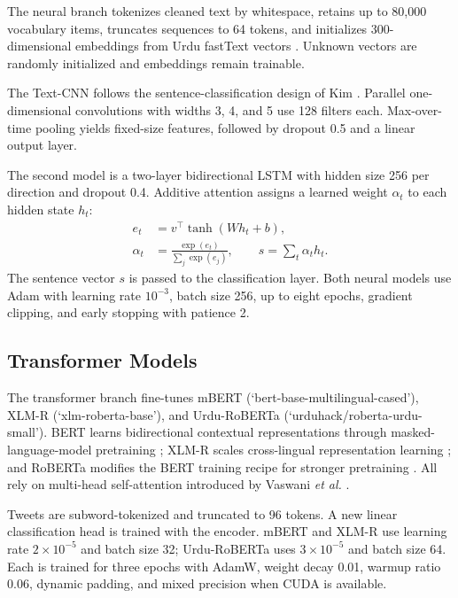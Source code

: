 \documentclass[conference]{IEEEtran}
\begin{document}
The neural branch tokenizes cleaned text by whitespace, retains up to 80,000 vocabulary items, truncates sequences to 64 tokens, and initializes 300-dimensional embeddings from Urdu fastText vectors \cite{mikolov2018fasttext}. Unknown vectors are randomly initialized and embeddings remain trainable.

The Text-CNN follows the sentence-classification design of Kim \cite{kim2014cnn}. Parallel one-dimensional convolutions with widths 3, 4, and 5 use 128 filters each. Max-over-time pooling yields fixed-size features, followed by dropout 0.5 and a linear output layer.

The second model is a two-layer bidirectional LSTM \cite{hochreiter1997lstm} with hidden size 256 per direction and dropout 0.4. Additive attention \cite{bahdanau2015attention} assigns a learned weight $\alpha_t$ to each hidden state $h_t$:
\begin{align}
e_t&=v^\top\tanh(Wh_t+b),\\
\alpha_t&=\frac{\exp(e_t)}{\sum_j\exp(e_j)},\qquad
s=\sum_t\alpha_t h_t.
\end{align}
The sentence vector $s$ is passed to the classification layer. Both neural models use Adam with learning rate $10^{-3}$, batch size 256, up to eight epochs, gradient clipping, and early stopping with patience 2.

\subsection{Transformer Models}

The transformer branch fine-tunes mBERT (`bert-base-multilingual-cased'), XLM-R (`xlm-roberta-base'), and Urdu-RoBERTa (`urduhack/roberta-urdu-small'). BERT learns bidirectional contextual representations through masked-language-model pretraining \cite{devlin2019bert}; XLM-R scales cross-lingual representation learning \cite{conneau2020xlmr}; and RoBERTa modifies the BERT training recipe for stronger pretraining \cite{liu2019roberta}. All rely on multi-head self-attention introduced by Vaswani \emph{et al.} \cite{vaswani2017attention}.

Tweets are subword-tokenized and truncated to 96 tokens. A new linear classification head is trained with the encoder. mBERT and XLM-R use learning rate $2\times10^{-5}$ and batch size 32; Urdu-RoBERTa uses $3\times10^{-5}$ and batch size 64. Each is trained for three epochs with AdamW, weight decay 0.01, warmup ratio 0.06, dynamic padding, and mixed precision when CUDA is available.
\end{document}
